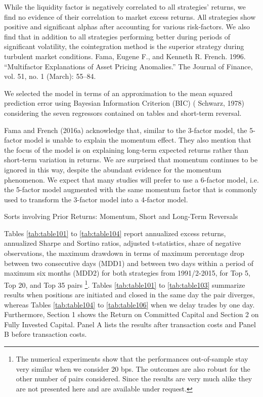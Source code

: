\documentclass[a4paper]{article}
\begin{document}
While the liquidity factor is negatively correlated to all
strategies’ returns, we find no evidence of their correlation to market excess returns. All strategies
show positive and significant alphas after accounting for various risk-factors. We also find that in
addition to all strategies performing better during periods of significant volatility, the cointegration
method is the superior strategy during turbulent market conditions.
Fama, Eugene F., and Kenneth R. French. 1996. “Multifactor Explanations of Asset Pricing Anomalies.” The Journal of Finance, vol. 51, no. 1 (March): 55–84.

We selected the model in terms of an approximation to the mean squared prediction error using Bayesian Information Criterion (BIC) ( Schwarz, 1978) considering the seven regressors contained on tables and short-term reversal. 

Fama and French (2016a) acknowledge that, similar to the 3-factor model, the 5-factor model is unable to explain the momentum effect. They also mention that the focus of the model is on explaining long-term expected returns rather than short-term variation in returns. We are surprised that momentum continues to be ignored in this way, despite the abundant evidence for the momentum phenomenon. We expect that many studies will prefer to use a 6-factor model, i.e. the 5-factor model augmented with the same momentum factor that is commonly used to transform the 3-factor model into a 4-factor model.

Sorts involving Prior Returns: Momentum, Short and Long-Term Reversals


	
Tables \ref{tab:table101} to \ref{tab:table104} report annualized excess returns, annualized Sharpe and Sortino ratios, \citet*{nw87} adjusted t-statistics, share of negative observations, the maximum drawdown in terms of maximum percentage drop between two consecutive days (MDD1) and between two days within a period of maximum six months (MDD2) for both strategies from 1991/2-2015, for Top 5, Top 20, and Top 35 pairs \footnote{The numerical experiments show that the performances out-of-sample stay very similar when we consider 20 bps. The outcomes are also robust for the other number of pairs considered. Since the results are very much alike they are not presented here and are available under request. }. Tables \ref{tab:table101} to \ref{tab:table103} summarize results when positions are initiated and closed in the same day the pair diverges, whereas Tables \ref{tab:table104} to \ref{tab:table106} when we delay trades by one day. Furthermore, Section 1 shows the Return on Committed Capital and Section 2 on Fully Invested Capital. Panel A lists the results after transaction costs and Panel B before transaction costs. 	
	
\end{document}
